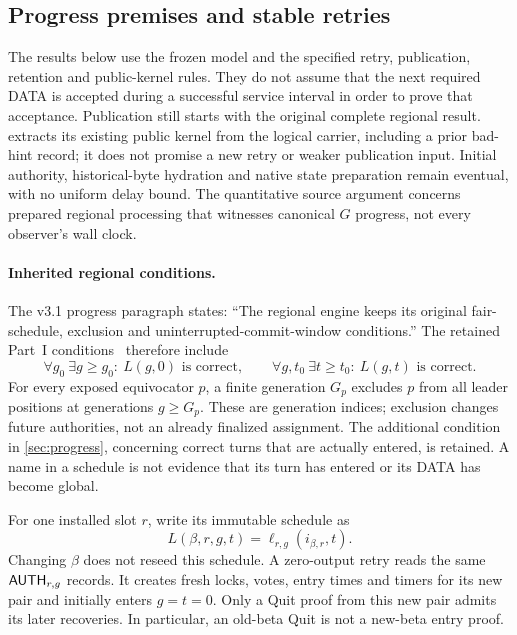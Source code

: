 \subsection{Progress premises and stable retries}
\label{sec:v35-progress-premises}
The results below use the frozen model and the specified retry,
publication, retention and public-kernel rules. They do not assume that
the next required DATA is accepted during a successful service interval
in order to prove that acceptance. Publication still starts with the
original complete regional result. 
extracts its existing public kernel from the logical carrier, including
a prior bad-hint record; it does not promise a new retry or weaker
publication input. Initial authority, historical-byte hydration and
native state preparation remain eventual, with no uniform delay bound.
The quantitative source argument concerns prepared regional processing
that witnesses canonical $G$ progress, not every observer's wall clock.

\paragraph{Inherited regional conditions.}
The v3.1 progress paragraph states: ``The regional engine keeps its
original fair-schedule, exclusion and uninterrupted-commit-window
conditions.'' The retained Part~I conditions~\cite{part1} therefore
include
\[
 \forall g_0\ \exists g\ge g_0:\ L(g,0)\text{ is correct},\qquad
 \forall g,t_0\ \exists t\ge t_0:\ L(g,t)\text{ is correct}.
\]
For every exposed equivocator $p$, a finite generation $G_p$ excludes
$p$ from all leader positions at generations $g\ge G_p$. These are
generation indices; exclusion changes future authorities, not an
already finalized assignment. The additional condition in
\cref{sec:progress}, concerning correct turns that are actually entered,
is retained. A name in a schedule is not evidence that its turn has
entered or its DATA has become global.

For one installed slot $r$, write its immutable schedule as
\[
 L(\beta,r,g,t)=\ell_{r,g}(i_{\beta,r},t).
\]
Changing $\beta$ does not reseed this schedule. A zero-output retry reads
the same $\mathsf{AUTH}_{r,g}$ records. It creates fresh locks, votes,
entry times and timers for its new pair and initially enters $g=t=0$.
Only a Quit proof from this new pair admits its later recoveries.
In particular, an old-beta Quit is not a new-beta entry proof.

